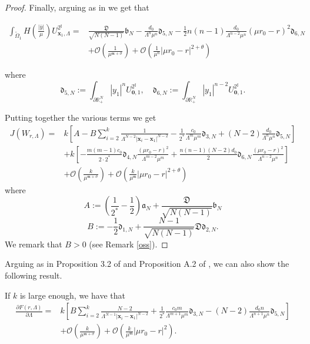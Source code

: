 \documentclass[11pt,a4paper]{amsart}
\begin{document}
\begin{proof}
Finally, arguing as in \cite{WangZhao_2013} we get that

$$\begin{aligned}
\int_{\widetilde\Omega_1}H\left(\frac{|\bar y|}{\mu}\right)U_{\mathbf{x}_1,\Lambda}^{2^\sharp}=&\frac{\mathfrak D}{\sqrt{N(N-1)}}\mathfrak b_N-\frac{d_0}{\Lambda^n\mu^n}\mathfrak d_{5, N}-\frac 12 n(n-1) \frac{d_0}{\Lambda^{n-2}\mu^n}(\mu r_0-r)^2\mathfrak d_{6, N}\\
&+\mathcal O\left(\frac{1}{\mu^{\mathfrak m+\sigma}}\right) +\mathcal O\left(\frac{1}{\mu^{n}}|\mu r_0-r|^{2+\theta}\right)   \end{aligned}$$

where
$$\mathfrak d_{5, N}:=\int_{\partial\mathbb R^N_+}|y_1|^nU_{\mathbf{0},1}^{2^\sharp},\quad \mathfrak d_{6, N}:= \int_{\partial\mathbb R^N_+}|y_1|^{n-2}U_{\mathbf{0},1}^{2^\sharp}.$$

Putting together the various terms we get
$$\begin{aligned}
J(W_{r, \Lambda})=&k\left[A-B\sum_{i=2}^k\frac{1}{\Lambda^{N-2}|\mathbf{x}_i-\mathbf{x}_1|^{N-2}}-\frac{1}{2^*}\frac{c_0}{\Lambda^m \mu^m}\mathfrak d_{3, N}+(N-2)\frac{d_0}{\Lambda^n \mu^n}\mathfrak d_{5, N}\right]\\
&+k\left[-\frac{m(m-1)c_0}{2\cdot2^*}\mathfrak d_{4, N}\frac{(\mu r_0-r)^2}{\Lambda^{m-2}\mu^m}+\frac{n(n-1)(N-2)d_0}{2}\mathfrak d_{6, N}\frac{(\mu r_0-r)^2}{\Lambda^{n-2}\mu^n}\right]\\
&+\mathcal O\left(\frac{k}{\mu^{\mathfrak m+\sigma}}\right)  +\mathcal O\left(\frac{k}{\mu^{\mathfrak m}}|\mu r_0-r|^{2+\theta}\right)\end{aligned}$$
where
$$A:=\left(\frac{1}{2^*}-\frac 1 2\right)\mathfrak a_N +\frac{\mathfrak D}{\sqrt{N(N-1)}}\mathfrak b_N$$
\begin{equation}\label{B}B:=-\frac 1 2\mathfrak d_{1, N}+\frac{N-1}{\sqrt{N(N-1)}}\mathfrak D \mathfrak d_{2, N}.\end{equation}
We remark that $B>0$ (see Remark \ref{oss}).
\end{proof}
Arguing as in Proposition 3.2 of \cite{WeiYan_2010a}
 and Proposition A.2 of  \cite{WangZhao_2013}, we can also show the following result.
 \begin{proposition}\label{der}
If $k$ is large enough, we have that
$$\begin{aligned} \frac{\partial F(r, \Lambda)}{\partial\Lambda}=&k\left[B\sum_{i=2}^k\frac{N-2}{\Lambda^{N-1}|\mathbf{x}_i-\mathbf{x}_1|^{N-2}}+\frac{1}{2^*}\frac{c_0m}{\Lambda^{m+1} \mu^m}\mathfrak d_{3, N}-(N-2)\frac{d_0n}{\Lambda^{n+1} \mu^n}\mathfrak d_{5, N}\right]\\
&+\mathcal O\left(\frac{k}{\mu^{\mathfrak m+\sigma}}\right)  +\mathcal O\left(\frac{k}{\mu^{\mathfrak m}}|\mu r_0-r|^{2}\right).
\end{aligned}$$
 \end{proposition}
\end{document}
